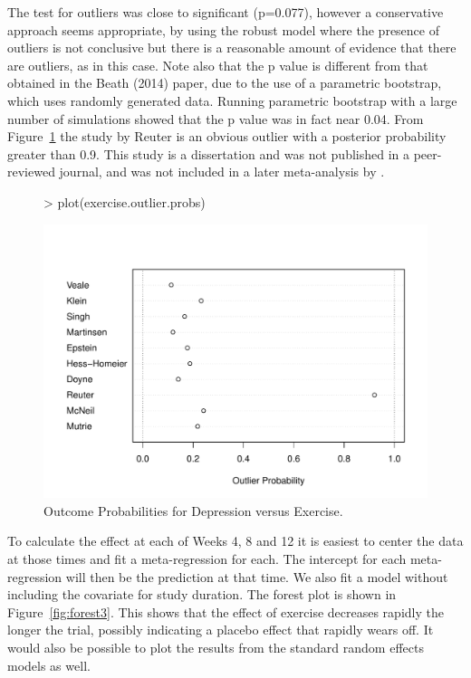 \documentclass{article}
\begin{document}
The test for outliers was close to significant (p=0.077), however a conservative approach seems appropriate, by using the robust model where the presence of outliers is not conclusive but there is a reasonable amount of evidence that there are outliers, as in this case. Note also that the p value is different from that obtained in the Beath (2014) paper, due to the use of a parametric bootstrap, which uses randomly generated data. Running parametric bootstrap with a large number of simulations showed that the p value was in fact near 0.04. From Figure~\ref{fig:outprobs3} the study by Reuter is an obvious outlier with a posterior probability greater than 0.9. This study is a dissertation and was not published in a peer-reviewed journal, and was not included in a later meta-analysis by \citet{Krogh2011}.


\begin{figure}
  \centering
\begin{Schunk}
\begin{Sinput}
> plot(exercise.outlier.probs)
\end{Sinput}
\end{Schunk}
\includegraphics{metaplus-examples-016}
  \caption{Outcome Probabilities for Depression versus Exercise.}
  \label{fig:outprobs3}
\end{figure}

To calculate the effect at each of Weeks 4, 8 and 12 it is easiest to center the data at those times and fit a meta-regression for each. The intercept for each meta-regression will then be the prediction at that time. We also fit a model without including the covariate for study duration. The forest plot is shown in Figure~\ref{fig:forest3}. This shows that the effect of exercise decreases rapidly the longer the trial, possibly indicating a placebo effect that rapidly wears off. It would also be possible to plot the results from the standard random effects models as well.
\end{document}
